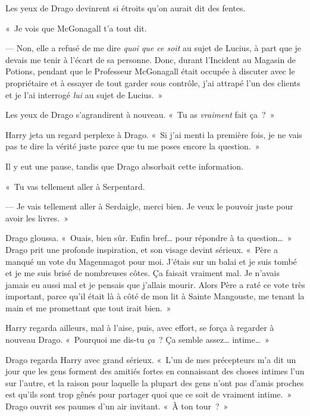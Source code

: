Les yeux de Drago devinrent si étroits qu'on aurait dit des fentes.

«~Je vois que McGonagall t'a tout dit.

--- Non, elle a refusé de me dire \emph{quoi que ce soit} au sujet de Lucius, à part que je devais me tenir à l'écart de sa personne. Donc, durant l'Incident au Magasin de Potions, pendant que le Professeur McGonagall était occupée à discuter avec le propriétaire et à essayer de tout garder sous contrôle, j'ai attrapé l'un des clients et je l'ai interrogé \emph{lui} au sujet de Lucius.~»

Les yeux de Drago s'agrandirent à nouveau. «~Tu as \emph{vraiment} fait ça~?~»

Harry jeta un regard perplexe à Drago. «~Si j'ai menti la première fois, je ne vais pas te dire la vérité juste parce que tu me poses encore la question.~»

Il y eut une pause, tandis que Drago absorbait cette information.

«~Tu vas tellement aller à Serpentard.

--- Je vais tellement aller à Serdaigle, merci bien. Je veux le pouvoir juste pour avoir les livres.~»

Drago gloussa. «~Ouais, bien sûr. Enfin bref… pour répondre à ta question…~» Drago prit une profonde inspiration, et son visage devint sérieux. «~Père a manqué un vote du Magenmagot pour moi. J'étais sur un balai et je suis tombé et je me suis brisé de nombreuses côtes. Ça faisait vraiment mal. Je n'avais jamais eu aussi mal et je pensais que j'allais mourir. Alors Père a raté ce vote très important, parce qu'il était là à côté de mon lit à Sainte Mangouste, me tenant la main et me promettant que tout irait bien.~»

Harry regarda ailleurs, mal à l'aise, puis, avec effort, se força à regarder à nouveau Drago. «~Pourquoi me dis-tu \emph{ça}~? Ça semble assez… intime…~»

Drago regarda Harry avec grand sérieux. «~L'un de mes précepteurs m'a dit un jour que les gens forment des amitiés fortes en connaissant des choses intimes l'un sur l'autre, et la raison pour laquelle la plupart des gens n'ont pas d'amis proches est qu'ils sont trop gênés pour partager quoi que ce soit de vraiment intime.~» Drago ouvrit ses paumes d'un air invitant. «~À ton tour~?~»

